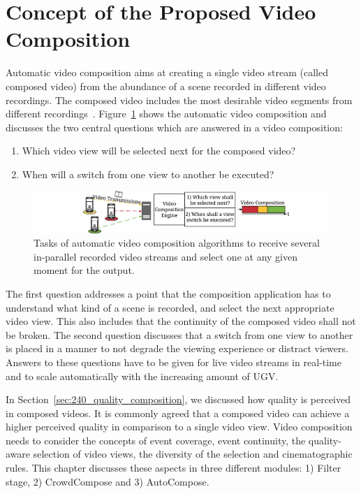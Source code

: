 \section{Concept of the Proposed Video Composition}
\label{sec:615_concept}
Automatic video composition aims at creating a single video stream (called composed video) from the abundance of a scene recorded in different video recordings.
The composed video includes the most desirable video segments from different recordings~\cite{Shrestha2010}.
Figure~\ref{fig:615_conceptvideocomposition} shows the automatic video composition and discusses the two central questions which are answered in a video composition:
\begin{enumerate}
	\item Which video view will be selected next for the composed video?
	\item When will a switch from one view to another be executed?
\end{enumerate}
\begin{figure}[tbh]
\centering
\includegraphics[width=\linewidth]{gfx/600_Composition/Concept_Video_Composition}
\caption[Tasks of automatic video composition algorithms]{Tasks of automatic video composition algorithms to receive several in-parallel recorded video streams and select one at any given moment for the output.}
\label{fig:615_conceptvideocomposition}
\end{figure}
The first question addresses a point that the composition application has to understand what kind of a scene is recorded, and select the next appropriate video view.
This also includes that the continuity of the composed video shall not be broken. 
The second question discusses that a switch from one view to another is placed in a manner to not degrade the viewing experience or distract viewers.
Answers to these questions have to be given for live video streams in real-time and to scale automatically with the increasing amount of \ac{UGV}.

In Section~\ref{sec:240_quality_composition}, we discussed how quality is perceived in composed videos.
It is commonly agreed that a composed video can achieve a higher perceived quality in comparison to a single video view.
Video composition needs to consider the concepts of event coverage, event continuity, the quality-aware selection of video views, the diversity of the selection and cinematographic rules.
This chapter discusses these aspects in three different modules: 1) Filter stage, 2) CrowdCompose and 3) AutoCompose.

